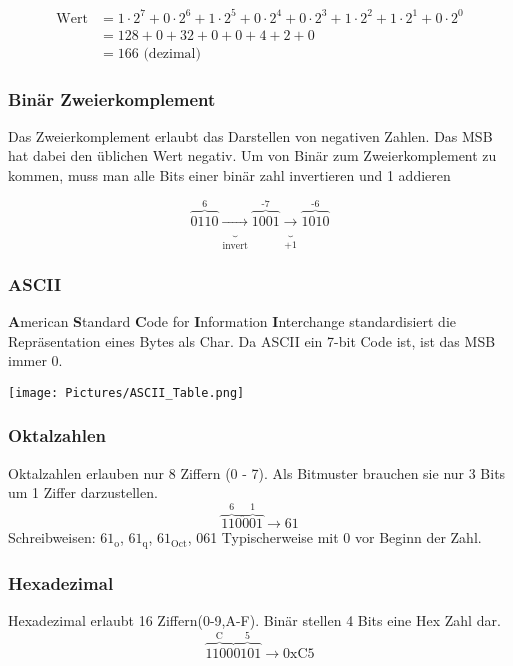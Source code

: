 \[
\begin{aligned}
\text{Wert} &= 1 \cdot 2^7+0 \cdot 2^6+1 \cdot 2^5+0 \cdot 2^4+0 \cdot 2^3+1 \cdot 2^2+1 \cdot 2^1+0 \cdot 2^0 \\
&= 128 + 0 + 32 + 0 + 0 + 4 + 2 + 0 \\
&= 166 \text{ (dezimal)}
\end{aligned}
\]

\subsubsection{Binär Zweierkomplement}

Das Zweierkomplement erlaubt das Darstellen von negativen Zahlen. Das MSB hat dabei den üblichen Wert negativ.\newline 
Um von Binär zum Zweierkomplement zu kommen, muss man alle Bits einer binär zahl invertieren und 1 addieren

\[
\overbrace{0110}^\text{6} 
\underbrace{\rightarrow}_\text{invert} 
\overbrace{1001}^\text{-7} 
\underbrace{\rightarrow}_{+1}
\overbrace{1010}^\text{-6} 
\]
\subsubsection{ASCII}

\textbf{A}merican \textbf{S}tandard \textbf{C}ode for \textbf{I}nformation \textbf{I}nterchange standardisiert die Repräsentation eines Bytes als Char. Da ASCII ein 7-bit Code ist, ist das MSB immer 0.

\texttt{[image: Pictures/ASCII\_Table.png]}

\subsubsection{Oktalzahlen}

Oktalzahlen erlauben nur 8 Ziffern (0 - 7). Als Bitmuster brauchen sie nur 3 Bits um 1 Ziffer darzustellen.
\[
\overbrace{110}^\text{6} 
\overbrace{001}^\text{1} 
\rightarrow 61
\]
Schreibweisen: $61_{\text{o}}$, $61_{\text{q}}$, $61_{\text{Oct}}$, 061\newline
Typischerweise mit 0 vor Beginn der Zahl.

\subsubsection{Hexadezimal}

Hexadezimal erlaubt 16 Ziffern(0-9,A-F). Binär stellen 4 Bits eine Hex Zahl dar.
\[
\overbrace{1100}^\text{C} 
\overbrace{0101}^\text{5} 
\rightarrow \text{0xC5}
\]

